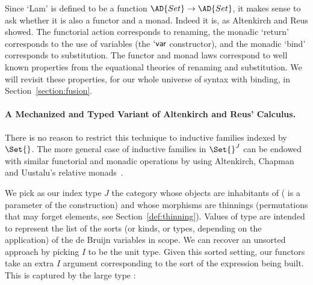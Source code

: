 Since `Lam' is defined to be a function $\AD{Set} \to \AD{Set}$, it
makes sense to ask whether it is also a functor and a monad. Indeed it
is, as Altenkirch and Reus showed. The functorial action corresponds
to renaming, the monadic `return' corresponds to the use of variables
(the $\mathsf{`var}$ constructor), and the monadic `bind' corresponds
to substitution. The functor and monad laws correspond to well known
properties from the equational theories of renaming and
substitution. We will revisit these properties, for our whole universe
of syntax with binding, in Section~\ref{section:fusion}.

\paragraph{A Mechanized and Typed Variant of Altenkirch and Reus' Calculus.}\label{section:mech-reus}

There is no reason to restrict this technique to inductive families
indexed by $\Set{}$. The more general case of inductive families in
$\Set{}^J$ can be endowed with similar functorial and monadic
operations by using Altenkirch, Chapman and Uustalu's relative
monads~\citeyear{Altenkirch2010, JFR4389}.

We pick as our index type $J$ the category whose objects are
inhabitants of   ( is a parameter of the
construction) and whose morphisms are thinnings (permutations that may
forget elements, see Section~\ref{def:thinning}).  Values of type
  are intended to represent the list of the sorts (or
kinds, or types, depending on the application) of the de Bruijn
variables in scope. We can recover an unsorted approach by picking $I$
to be the unit type.  Given this sorted setting, our functors take an
extra $I$ argument corresponding to the sort of the expression being
built. This is captured by the large type 
:%


